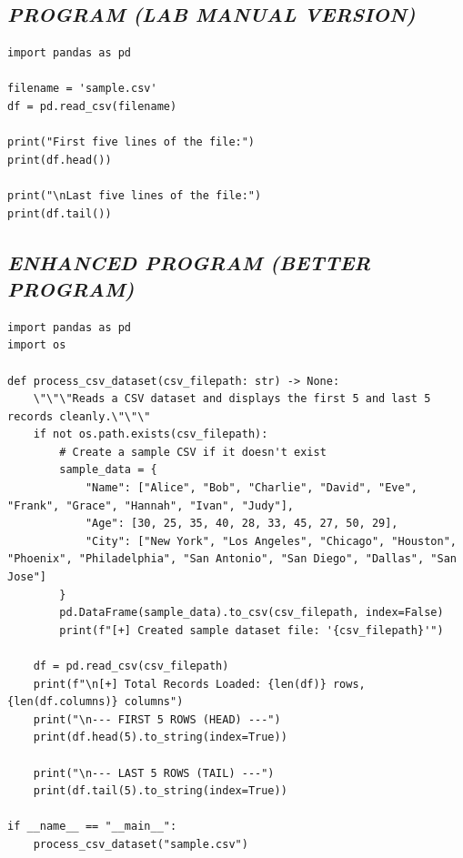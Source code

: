 \documentclass[11pt,a4paper]{article}
\begin{document}
\subsection*{\textit{PROGRAM (LAB MANUAL VERSION)}}
\begin{lstlisting}[style=pythonstyle]
import pandas as pd 
 
filename = 'sample.csv' 
df = pd.read_csv(filename) 
 
print("First five lines of the file:") 
print(df.head()) 
 
print("\nLast five lines of the file:") 
print(df.tail())
\end{lstlisting}

\subsection*{\textit{ENHANCED PROGRAM (BETTER PROGRAM)}}
\begin{lstlisting}[style=pythonstyle]
import pandas as pd
import os

def process_csv_dataset(csv_filepath: str) -> None:
    \"\"\"Reads a CSV dataset and displays the first 5 and last 5 records cleanly.\"\"\"
    if not os.path.exists(csv_filepath):
        # Create a sample CSV if it doesn't exist
        sample_data = {
            "Name": ["Alice", "Bob", "Charlie", "David", "Eve", "Frank", "Grace", "Hannah", "Ivan", "Judy"],
            "Age": [30, 25, 35, 40, 28, 33, 45, 27, 50, 29],
            "City": ["New York", "Los Angeles", "Chicago", "Houston", "Phoenix", "Philadelphia", "San Antonio", "San Diego", "Dallas", "San Jose"]
        }
        pd.DataFrame(sample_data).to_csv(csv_filepath, index=False)
        print(f"[+] Created sample dataset file: '{csv_filepath}'")

    df = pd.read_csv(csv_filepath)
    print(f"\n[+] Total Records Loaded: {len(df)} rows, {len(df.columns)} columns")
    print("\n--- FIRST 5 ROWS (HEAD) ---")
    print(df.head(5).to_string(index=True))
    
    print("\n--- LAST 5 ROWS (TAIL) ---")
    print(df.tail(5).to_string(index=True))

if __name__ == "__main__":
    process_csv_dataset("sample.csv")
\end{lstlisting}
\end{document}
